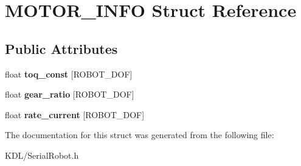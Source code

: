 \hypertarget{struct_m_o_t_o_r___i_n_f_o}{}\section{M\+O\+T\+O\+R\+\_\+\+I\+N\+FO Struct Reference}
\label{struct_m_o_t_o_r___i_n_f_o}
\subsection*{Public Attributes}
\begin{DoxyCompactItemize}
\item 
\mbox{\label{struct_m_o_t_o_r___i_n_f_o_ab63a1eb86be28a9b4b71b568f4a4523d}} 
float {\bfseries toq\+\_\+const} \mbox{[}R\+O\+B\+O\+T\+\_\+\+D\+OF\mbox{]}
\item 
\mbox{\label{struct_m_o_t_o_r___i_n_f_o_a75dd4256253053e0849f0243052329ed}} 
float {\bfseries gear\+\_\+ratio} \mbox{[}R\+O\+B\+O\+T\+\_\+\+D\+OF\mbox{]}
\item 
\mbox{\label{struct_m_o_t_o_r___i_n_f_o_a0e8b4eb642181be2fa19610690d9d9a6}} 
float {\bfseries rate\+\_\+current} \mbox{[}R\+O\+B\+O\+T\+\_\+\+D\+OF\mbox{]}
\end{DoxyCompactItemize}


The documentation for this struct was generated from the following file\+:\begin{DoxyCompactItemize}
\item 
K\+D\+L/Serial\+Robot.\+h\end{DoxyCompactItemize}
